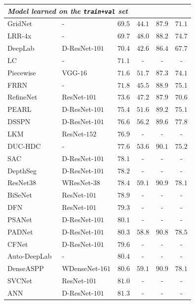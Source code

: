 \documentclass[10pt,journal,compsoc]{IEEEtran}
\begin{document}
\begin{table}[t]
\begin{tabular}{l|l|cccc}
			\hline
			\multicolumn{3}{l}{
			\emph {Model learned on the \texttt{train+val} set}}\\
			\hline
			GridNet~\cite{FourureEFMT017} & - & $69.5$ & $44.1$ & $87.9$ & $71.1$\\
			LRR-4x~\cite{GhiasiF16} & - & $69.7$ & $48.0$ & $88.2$ & $74.7$\\
			DeepLab~\cite{ChenPKMY18} & D-ResNet-$101$ & $70.4$ & $42.6$ & $86.4$ & $67.7$\\
			LC~\cite{LiLLLT17}& - & $71.1$ & - & - & - \\
			Piecewise~\cite{LinSHR16}& VGG-$16$ & $71.6$ & $51.7$ & $87.3$ & $74.1$\\
			FRRN~\cite{PohlenHML17}& - & $71.8$ & $45.5$ & $88.9$ & $75.1$\\
			RefineNet~\cite{LinMSR17}& ResNet-$101$ & $73.6$ & $47.2$ & $87.9$ & $70.6$\\
			PEARL~\cite{JinLXSLYCDLJFY17} & D-ResNet-$101$ & $75.4$ & $51.6$ & $89.2$ & $75.1$ \\
			DSSPN~\cite{LiangZX18} & D-ResNet-$101$ & $76.6$ & $56.2$ & $89.6$ & $77.8$\\
			LKM~\cite{PengZYLS17}& ResNet-$152$ & $76.9$ & - & - & - \\
			DUC-HDC~\cite{WangCYLHHC18}& - & $77.6$ & $53.6$ & $90.1$ & $75.2$\\
			SAC~\cite{ZhangTZLY17} & D-ResNet-$101$ & $78.1$ & - & - & - \\
			DepthSeg~\cite{KongF18} & D-ResNet-$101$ & $78.2$& - & - & - \\
			ResNet38~\cite{WuSH16e} & WResNet-38 &$78.4$ &$59.1$ &$90.9$ &$78.1$ \\
			BiSeNet~\cite{YuWPGYS182} & ResNet-$101$ & $78.9$ & - & - & - \\
			DFN~\cite{YuWPGYS18} & ResNet-$101$ & $79.3$ & - & - & - \\
			PSANet~\cite{ZhaoZLSLLJ18} & D-ResNet-$101$ & $80.1$ & - & - & - \\
			PADNet~\cite{OWS18} & D-ResNet-$101$ & $80.3$ & $58.8$ & $90.8$ & $78.5$\\
			CFNet~\cite{ZhangZWX} & D-ResNet-$101$ & $79.6$ & - & - & -\\
			Auto-DeepLab~\cite{liu2019auto} & - & $80.4$ & - & - & -\\
			DenseASPP~\cite{ZhaoSQWJ17} & WDenseNet-$161$ & $80.6$ & $59.1$ & $90.9$ & $78.1$ \\
			SVCNet~\cite{DingJSLW19} & ResNet-$101$ & $81.0$ & - & - & -\\
			ANN~\cite{ZhuXBHB2019} & D-ResNet-$101$ & $81.3$ & - & - & -\\

\end{tabular}
\end{table}
\end{document}
